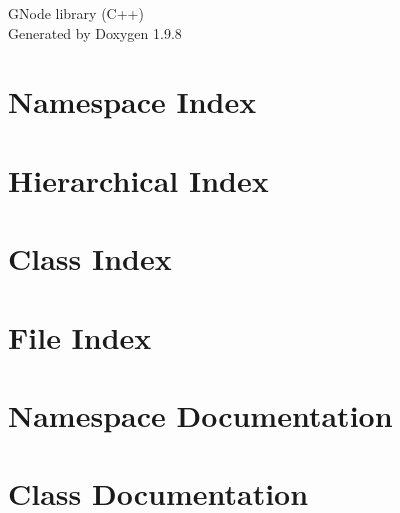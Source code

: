 \documentclass[twoside]{book}
\newcommand{\+}{\discretionary{\mbox{\scriptsize$\hookleftarrow$}}{}{}}
\newcommand{\clearemptydoublepage}{%
    \newpage{\pagestyle{empty}\cleardoublepage}%
  }
\begin{document}
  \raggedbottom
    \hypersetup{pageanchor=false,
                bookmarksnumbered=true,
                pdfencoding=unicode
               }
  \begin{titlepage}
  \vspace*{7cm}
  \begin{center}%
  {\Large GNode library (\+C++)}\\
  \vspace*{1cm}
  {\large Generated by Doxygen 1.9.8}\\
  \end{center}
  \end{titlepage}
  \clearemptydoublepage
  \tableofcontents
  \clearemptydoublepage
  \hypersetup{pageanchor=true}

\chapter{Namespace Index}

\chapter{Hierarchical Index}

\chapter{Class Index}

\chapter{File Index}

\chapter{Namespace Documentation}

\chapter{Class Documentation}














\end{document}
